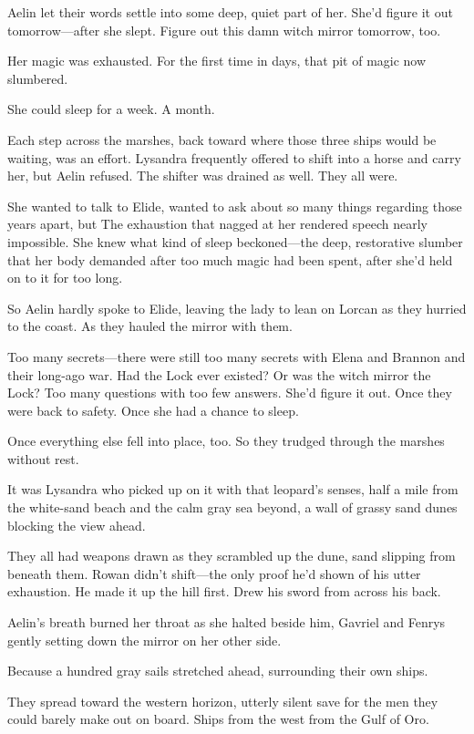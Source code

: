 Aelin let their words settle into some deep, quiet part of her. She'd figure it out tomorrow---after she slept. Figure out this damn witch mirror tomorrow, too.

Her magic was exhausted. For the first time in days, that pit of magic now slumbered.

She could sleep for a week. A month.

Each step across the marshes, back toward where those three ships would be waiting, was an effort. Lysandra frequently offered to shift into a horse and carry her, but Aelin refused. The shifter was drained as well. They all were.

She wanted to talk to Elide, wanted to ask about so many things regarding those years apart, but  The exhaustion that nagged at her rendered speech nearly impossible. She knew what kind of sleep beckoned---the deep, restorative slumber that her body demanded after too much magic had been spent, after she'd held on to it for too long.

So Aelin hardly spoke to Elide, leaving the lady to lean on Lorcan as they hurried to the coast. As they hauled the mirror with them.

Too many secrets---there were still too many secrets with Elena and Brannon and their long-ago war. Had the Lock ever existed? Or was the witch mirror the Lock? Too many questions with too few answers. She'd figure it out. Once they were back to safety. Once she had a chance to sleep.

Once  everything else fell into place, too. So they trudged through the marshes without rest.

It was Lysandra who picked up on it with that leopard's senses, half a mile from the white-sand beach and the calm gray sea beyond, a wall of grassy sand dunes blocking the view ahead.

They all had weapons drawn as they scrambled up the dune, sand slipping from beneath them. Rowan didn't shift---the only proof he'd shown of his utter exhaustion. He made it up the hill first. Drew his sword from across his back.

Aelin's breath burned her throat as she halted beside him, Gavriel and Fenrys gently setting down the mirror on her other side.

Because a hundred gray sails stretched ahead, surrounding their own ships.

They spread toward the western horizon, utterly silent save for the men they could barely make out on board. Ships from the west  from the Gulf of Oro.

